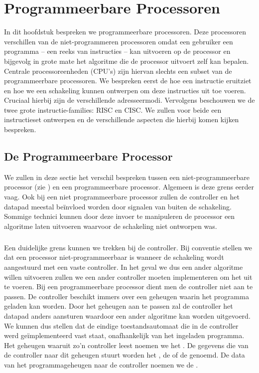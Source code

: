 \chapter{Programmeerbare Processoren}
\begin{chapterintro}
In dit hoofdstuk bespreken we programmeerbare processoren. Deze processoren verschillen van de niet-programmeren processoren omdat een gebruiker een programma -- een reeks van instructies -- kan uitvoeren op de processor en bijgevolg in grote mate het algoritme die de processor uitvoert zelf kan bepalen. Centrale processoreenheden (CPU's) zijn hiervan slechts een subset van de programmeerbare processoren. We bespreken eerst de hoe een instructie eruitziet en hoe we een schakeling kunnen ontwerpen om deze instructies uit toe voeren. Cruciaal hierbij zijn de verschillende adresseermodi. Vervolgens beschouwen we de twee grote instructie-families: RISC en CISC. We zullen voor beide een instructieset ontwerpen en de verschillende aspecten die hierbij komen kijken bespreken.
\end{chapterintro}
\minitoc[n]
\section{De Programmeerbare Processor}
We zullen in deze sectie het verschil bespreken tussen een niet-programmeerbare processor (zie ) en een programmeerbare processor. Algemeen is deze grens eerder vaag. Ook bij een niet programmeerbare processor zullen de controller en het datapad meestal be\"invloed worden door signalen van buiten de schakeling. Sommige technici kunnen door deze invoer te manipuleren de processor een algoritme laten uitvoeren waarvoor de schakeling niet ontworpen was.
\paragraph{}
Een duidelijke grens kunnen we trekken bij de controller. Bij conventie stellen we dat een processor niet-programmeerbaar is wanneer de schakeling wordt aangestuurd met een vaste controller. In het geval we dus een ander algoritme willen uitvoeren zullen we een ander controller moeten implementeren om het uit te voeren. Bij een programmeerbare processor dient men de controller niet aan te passen. De controller beschikt immers over een geheugen waarin het programma geladen kan worden. Door het geheugen aan te passen zal de controller het datapad anders aansturen waardoor een ander algoritme kan worden uitgevoerd. We kunnen dus stellen dat de eindige toestandsautomaat die in de controller werd ge\"implementeerd vast staat, onafhankelijk van het ingeladen programma. Het geheugen waaruit zo'n controller leest noemen we het . De gegevens die van de controller naar dit geheugen stuurt worden het , de  of de  genoemd. De data van het programmageheugen naar de controller noemen we de .
